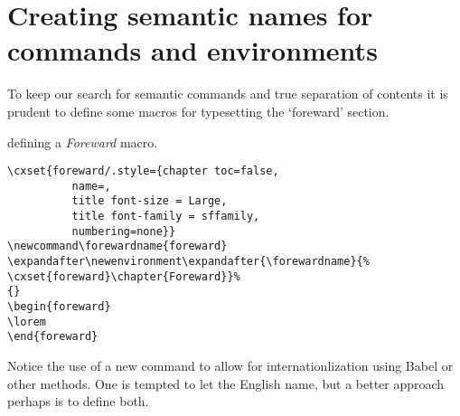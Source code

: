 \section{Creating semantic names for commands and environments}

To keep our search for semantic commands and true separation of contents it is prudent to define some macros for typesetting the  `foreward' section.

\bgroup
\begin{texexample}{defining a \textit{Foreward} macro.}{}
\begin{lstlisting}
\cxset{foreward/.style={chapter toc=false,
          name=,
          title font-size = Large,
          title font-family = sffamily,
          numbering=none}}
\newcommand\forewardname{foreward}
\expandafter\newenvironment\expandafter{\forewardname}{%
\cxset{foreward}\chapter{Foreward}}%
{}
\begin{foreward}
\lorem
\end{foreward}
\end{lstlisting}
\end{texexample}
\egroup

Notice the use of a new command \cmd{\forewardname} to allow for internationlization using Babel or other methods. One is tempted to let the English name, but a better approach perhaps is to define both.

\makeatletter

